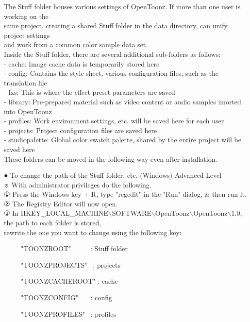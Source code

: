 \documentclass[a4paper,10pt]{article}
\begin{document}
\normalsize
\noindent The Stuff folder houses various settings of OpenToonz. If more than one user is working on the\\
 same project, creating a shared Stuff folder in the data directory, can unify project settings\\
and work from a common color sample data set.\\
Inside the Stuff folder, there are several additional sub-folders as follows:\\
- cache: Image cache data is temporarily stored here\\
- config: Contains the style sheet, various configuration files, such as the translation file\\
- fxs: This is where the effect preset parameters are saved\\
- library: Pre-prepared material such as video content or audio samples imorted into OpenToonz\\
- profiles: Work environment settings, etc. will be saved here for each user\\
- projects: Project configuration files are saved here\\
- studiopalette: Global color swatch palette, shared by the entire project will be saved here\\
These folders can be moved in the following way even after installation.\\[0.4em]
\par
\large
\noindent ● To change the path of the Stuff folder, etc. (Windows) \normalsize \colorbox{fontpink}{\color{black}Advanced Level}\\
※ With administrator privileges do the following.\\
① Press the Windows key + R, type "regedit" in the "Run" dialog, \& then run it.\\
② The Registry Editor will now open.\\
③ In HKEY\_LOCAL\_MACHINE$\backslash$SOFTWARE$\backslash$OpenToonz$\backslash$OpenToonz$\backslash$1.0, the path to each folder is stored,\\
rewrite the one you want to change using the following key:\par
\ \ \ \ \ "TOONZROOT" \ \ \ \ \ : Stuff folder\par
\ \ \ \ \ "TOONZPROJECTS" \ : projects\par
\ \ \ \ \ "TOONZCACHEROOT" : cache\par
\ \ \ \ \ "TOONZCONFIG" \ \ \ : config\par
\ \ \ \ \ "TOONZPROFILES" \ : profiles\par
\end{document}
